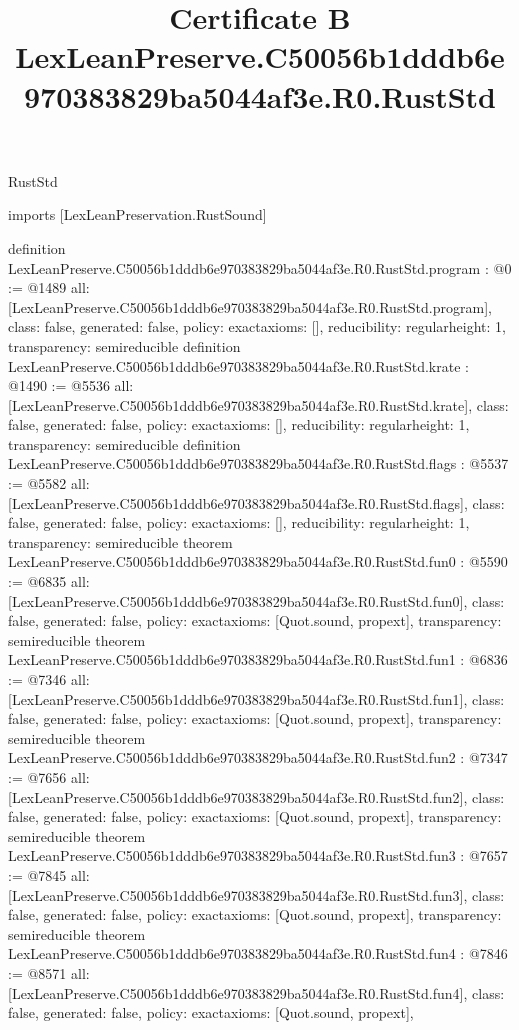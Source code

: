 \begin{lexlean}{RustStd}
\title{Certificate B LexLeanPreserve.C50056b1dddb6e970383829ba5044af3e.R0.RustStd}
\begin{coremodule}
imports [LexLeanPreservation.RustSound]

definition LexLeanPreserve.C50056b1dddb6e970383829ba5044af3e.R0.RustStd.program : @0 := @1489 {
  all: [LexLeanPreserve.C50056b1dddb6e970383829ba5044af3e.R0.RustStd.program],
  class: false,
  generated: false,
  policy: exact{axioms: []},
  reducibility: regular{height: 1},
  transparency: semireducible
}
definition LexLeanPreserve.C50056b1dddb6e970383829ba5044af3e.R0.RustStd.krate : @1490 := @5536 {
  all: [LexLeanPreserve.C50056b1dddb6e970383829ba5044af3e.R0.RustStd.krate],
  class: false,
  generated: false,
  policy: exact{axioms: []},
  reducibility: regular{height: 1},
  transparency: semireducible
}
definition LexLeanPreserve.C50056b1dddb6e970383829ba5044af3e.R0.RustStd.flags : @5537 := @5582 {
  all: [LexLeanPreserve.C50056b1dddb6e970383829ba5044af3e.R0.RustStd.flags],
  class: false,
  generated: false,
  policy: exact{axioms: []},
  reducibility: regular{height: 1},
  transparency: semireducible
}
theorem LexLeanPreserve.C50056b1dddb6e970383829ba5044af3e.R0.RustStd.fun0 : @5590 := @6835 {
  all: [LexLeanPreserve.C50056b1dddb6e970383829ba5044af3e.R0.RustStd.fun0],
  class: false,
  generated: false,
  policy: exact{axioms: [Quot.sound, propext]},
  transparency: semireducible
}
theorem LexLeanPreserve.C50056b1dddb6e970383829ba5044af3e.R0.RustStd.fun1 : @6836 := @7346 {
  all: [LexLeanPreserve.C50056b1dddb6e970383829ba5044af3e.R0.RustStd.fun1],
  class: false,
  generated: false,
  policy: exact{axioms: [Quot.sound, propext]},
  transparency: semireducible
}
theorem LexLeanPreserve.C50056b1dddb6e970383829ba5044af3e.R0.RustStd.fun2 : @7347 := @7656 {
  all: [LexLeanPreserve.C50056b1dddb6e970383829ba5044af3e.R0.RustStd.fun2],
  class: false,
  generated: false,
  policy: exact{axioms: [Quot.sound, propext]},
  transparency: semireducible
}
theorem LexLeanPreserve.C50056b1dddb6e970383829ba5044af3e.R0.RustStd.fun3 : @7657 := @7845 {
  all: [LexLeanPreserve.C50056b1dddb6e970383829ba5044af3e.R0.RustStd.fun3],
  class: false,
  generated: false,
  policy: exact{axioms: [Quot.sound, propext]},
  transparency: semireducible
}
theorem LexLeanPreserve.C50056b1dddb6e970383829ba5044af3e.R0.RustStd.fun4 : @7846 := @8571 {
  all: [LexLeanPreserve.C50056b1dddb6e970383829ba5044af3e.R0.RustStd.fun4],
  class: false,
  generated: false,
  policy: exact{axioms: [Quot.sound, propext]},
}
\end{coremodule}
\end{lexlean}
